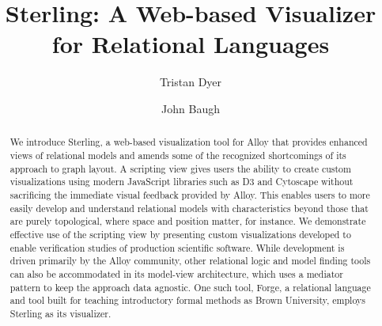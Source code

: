 \documentclass[runningheads]{llncs}
\begin{document}
\title{Sterling: A Web-based Visualizer for Relational Languages}
\author{Tristan Dyer  \and John Baugh }



\maketitle

\begin{abstract}
We introduce Sterling, a web-based visualization tool for Alloy that provides enhanced views of relational models and amends some of the recognized shortcomings of its approach to graph layout.
A scripting view gives users the ability to create custom visualizations using modern JavaScript libraries such as D3 and Cytoscape without sacrificing the immediate visual feedback provided by Alloy. This enables users to more easily develop and understand relational models with characteristics beyond those that are purely topological, where space and position matter, for instance.
We demonstrate effective use of the scripting view by presenting custom visualizations developed to enable verification studies of production scientific software.
While development is driven primarily by the Alloy community, other relational logic and model finding tools can also be accommodated in its model-view architecture, which uses a mediator pattern to keep the approach data agnostic. One such tool, Forge, a relational language and tool built for teaching introductory formal methods as Brown University, employs Sterling as its visualizer.

\end{abstract}

\end{document}

